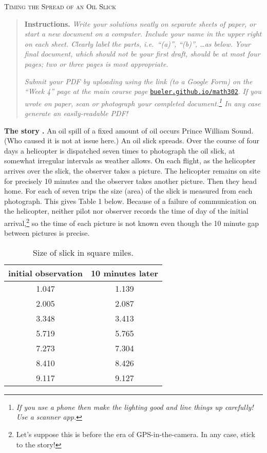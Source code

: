 \documentclass[12pt]{article}
\begin{document}
\renewcommand{\d}{\displaystyle}

\strut
\centerline{{\Large \textsc{Timing the Spread of an Oil Slick}}}

\medskip
\small
\begin{quote}
\textbf{Instructions.}  \emph{Write your solutions neatly on separate sheets of paper, or start a new document on a computer.  Include your name in the upper right on each sheet.  Clearly label the parts, i.e.~``\emph{(a)}'', ``\emph{(b)}'', \dots as below.  Your final document, which should \emph{not} be your first draft, should be at most four pages; two or three pages is most appropriate.}

\emph{Submit your PDF by uploading using the link (to a Google Form) on the ``Week 4'' page at the main course page} \href{https://bueler.github.io/math302/index.html}{\texttt{bueler.github.io/math302}}.  \emph{If you wrote on paper, scan or photograph your completed document.\footnote{\emph{If you use a phone then make the lighting good and line things up carefully!  Use a scanner app.}}  In any case generate an easily-readable PDF!}
\end{quote}

\normalsize
\bigskip


\textbf{The story \cite{Winkel2015}.}  An oil spill of a fixed amount of oil occurs Prince William Sound.  (Who caused it is not at issue here.)  An oil slick spreads.  Over the course of four days a helicopter is dispatched seven times to photograph the oil slick, at somewhat irregular intervals as weather allows.  On each flight, as the helicopter arrives over the slick, the observer takes a picture.  The helicopter remains on site for precisely 10 minutes and the observer takes another picture.  Then they head home.  For each of seven trips the size (area) of the slick is measured from each photograph.  This gives Table 1 below.  Because of a failure of communication on the helicopter, neither pilot nor observer records the time of day of the initial arrival,\footnote{Let's suppose this is before the era of GPS-in-the-camera.  In any case, stick to the story!} so the time of each picture is not known even though  the 10 minute gap between pictures is precise.

\bigskip

\begin{table}[h]
\begin{center}
\begin{tabular}{|c|c|} \hline
initial observation & 10 minutes later \\ \hline
1.047 & 1.139 \\
2.005 & 2.087 \\
3.348 & 3.413 \\
5.719 & 5.765 \\
7.273 & 7.304 \\
8.410 & 8.426 \\
9.117 & 9.127 \\ \hline
\end{tabular}
\end{center}

\vspace{-4mm}
\caption{Size of slick in square miles.}
\end{table}
\end{document}
